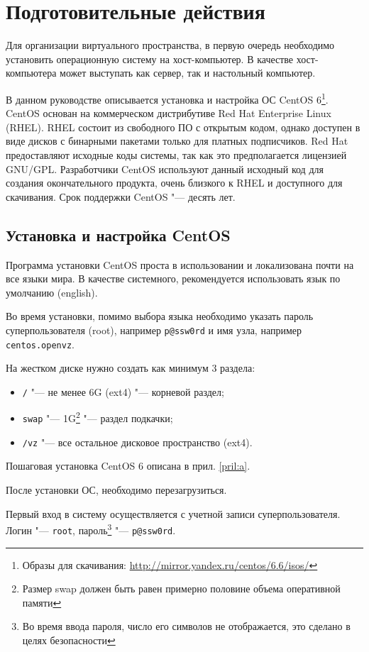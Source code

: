 \section{Подготовительные действия}

Для организации виртуального пространства, в первую очередь необходимо установить операционную систему на хост-компьютер. 
В качестве хост-компьютера может выступать как сервер, так и настольный компьютер.

В данном руководстве описывается установка и настройка ОС CentOS 6\footnote{Образы для скачивания: \url{http://mirror.yandex.ru/centos/6.6/isos/}}.
CentOS основан на коммерческом дистрибутиве Red Hat Enterprise Linux (RHEL). 
RHEL состоит из свободного ПО с открытым кодом, однако доступен в виде дисков с бинарными пакетами только для платных подписчиков. 
Red Hat предоставляют исходные коды системы, так как это предполагается лицензией GNU/GPL.
Разработчики CentOS используют данный исходный код для создания окончательного продукта, очень близкого к RHEL и доступного для скачивания.
Срок поддержки CentOS "--- десять лет.

\subsection{Установка и настройка CentOS}
Программа установки CentOS проста в использовании и локализована почти на все языки мира. 
В качестве системного, рекомендуется использовать язык по умолчанию (english).

Во время установки, помимо выбора языка необходимо указать пароль суперпользователя (root), например \texttt{p@ssw0rd} и имя узла, например \texttt{centos.openvz}.

На жестком диске нужно создать как минимум 3 раздела:
\begin{itemize}
\item \texttt{/} "--- не менее 6G (ext4) "--- корневой раздел;
\item \texttt{swap} "--- 1G\footnote{Размер swap должен быть равен примерно половине объема оперативной памяти} "--- раздел подкачки;
\item \texttt{/vz} "--- все остальное дисковое пространство (ext4).
\end{itemize}

Пошаговая установка CentOS 6 описана в прил. \ref{pril:a}.

После установки ОС, необходимо перезагрузиться.

Первый вход в систему осуществляется с учетной записи суперпользователя. Логин "--- \texttt{root}, пароль\footnote{Во время ввода пароля, число его символов не отображается, это сделано в целях безопасности} "--- \texttt{p@ssw0rd}.

